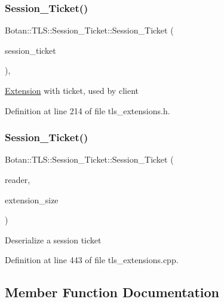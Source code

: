 \subsubsection{\texorpdfstring{Session\+\_\+\+Ticket()}{Session\_Ticket()}\hspace{0.1cm}{\footnotesize\ttfamily [2/3]}}
{\footnotesize\ttfamily Botan\+::\+T\+L\+S\+::\+Session\+\_\+\+Ticket\+::\+Session\+\_\+\+Ticket (\begin{DoxyParamCaption}\item[{const std\+::vector$<$ uint8\+\_\+t $>$ \&}]{session\+\_\+ticket }\end{DoxyParamCaption})\hspace{0.3cm}{\ttfamily [inline]}, {\ttfamily [explicit]}}

\mbox{\hyperlink{class_botan_1_1_t_l_s_1_1_extension}{Extension}} with ticket, used by client 

Definition at line 214 of file tls\+\_\+extensions.\+h.

\mbox{\label{class_botan_1_1_t_l_s_1_1_session___ticket_a677e88a19f33368be6ffa73b2b86a58a}} 
\subsubsection{\texorpdfstring{Session\+\_\+\+Ticket()}{Session\_Ticket()}\hspace{0.1cm}{\footnotesize\ttfamily [3/3]}}
{\footnotesize\ttfamily Botan\+::\+T\+L\+S\+::\+Session\+\_\+\+Ticket\+::\+Session\+\_\+\+Ticket (\begin{DoxyParamCaption}\item[{\mbox{\hyperlink{class_botan_1_1_t_l_s_1_1_t_l_s___data___reader}{T\+L\+S\+\_\+\+Data\+\_\+\+Reader}} \&}]{reader,  }\item[{uint16\+\_\+t}]{extension\+\_\+size }\end{DoxyParamCaption})}

Deserialize a session ticket 

Definition at line 443 of file tls\+\_\+extensions.\+cpp.



\subsection{Member Function Documentation}
\mbox{\label{class_botan_1_1_t_l_s_1_1_session___ticket_abe74c7dc9a16b878f02694e62364243d}} 
